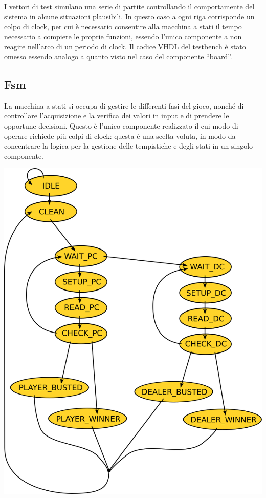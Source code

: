 \documentclass [11pt,a4paper,oneside]{article}
\begin{document}


I vettori di test simulano una serie di partite controllando il 
comportamente del sistema in alcune situazioni plausibili.
In questo caso a ogni riga corrisponde un colpo di clock, per cui
è necessario consentire alla macchina a stati il tempo necessario
a compiere le proprie funzioni, essendo l'unico componente a non
reagire nell'arco di un periodo di clock. Il codice VHDL del 
testbench è stato omesso essendo analogo a quanto visto nel caso del
componente ``board''.

\subsection{Fsm}

La macchina a stati si occupa di gestire le differenti fasi del gioco,
nonché di controllare l'acquisizione e la verifica dei valori in input
e di prendere le opportune decisioni. Questo è l'unico componente
realizzato il cui modo di operare richiede più colpi di clock: questa
è una scelta voluta, in modo da concentrare la logica per la gestione
delle tempistiche e degli stati in un singolo componente.

\includegraphics{fsm}
\end{document}
